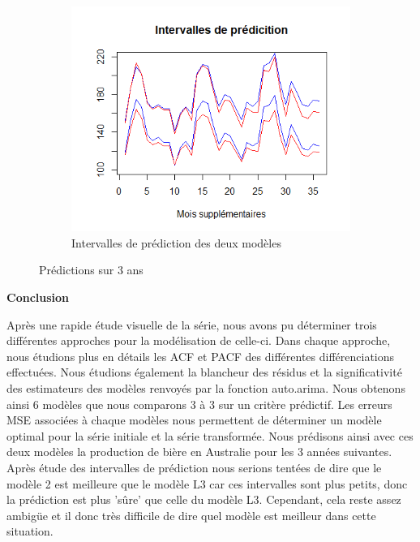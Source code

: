\documentclass[12pt,a4paper]{book}
\newcommand{\1}{\mathds{1}}
\begin{document}
\begin{figure}[h!]
    \centering
    \begin{subfigure}{.5\textwidth}
    	\centering
    	\includegraphics[width=\textwidth]{int_pred}  
    	\caption{Intervalles de prédiction des deux modèles}
    	\label{fig:sub2}
    \end{subfigure}

\caption{Prédictions sur 3 ans}
\end{figure}


\newpage

\noindent
{\LARGE \textbf{Conclusion}}

\vspace{5 mm}
Après une rapide étude visuelle de la série, nous avons pu déterminer trois différentes approches pour la modélisation de celle-ci. Dans chaque approche, nous étudions plus en détails les ACF et PACF des différentes différenciations effectuées. Nous étudions également la blancheur des résidus et la significativité des estimateurs des modèles renvoyés par la fonction auto.arima. Nous obtenons ainsi 6 modèles que nous comparons 3 à 3 sur un critère prédictif. Les erreurs MSE associées à chaque modèles nous permettent de déterminer un modèle optimal pour la série initiale et la série transformée. Nous prédisons ainsi avec ces deux modèles la production de bière en Australie pour les 3 années suivantes. 
Après étude des intervalles de prédiction nous serions tentées de dire que le modèle 2 est meilleure que le modèle L3 car ces intervalles sont plus petits, donc la prédiction est plus 'sûre' que celle du modèle L3. Cependant, cela reste assez ambigüe et il donc très difficile de dire quel modèle est meilleur dans cette situation.
\end{document}
